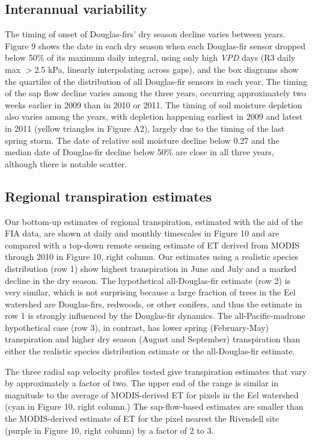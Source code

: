 \subsection{Interannual variability}
The timing of onset of Douglas-firs' dry season decline varies between years.  Figure 9 shows the date in each dry season when each Douglas-fir sensor dropped below 50\% of its maximum daily integral, using only high \textit{VPD} days (R3 daily max $>$2.5 kPa, linearly interpolating across gaps), and the box diagrams show the quartiles of the distribution of all Douglas-fir sensors in each year.  The timing of the sap flow decline varies among the three years, occurring approximately two weeks earlier in 2009 than in 2010 or 2011.  The timing of soil moisture depletion also varies among the years, with depletion happening earliest in 2009 and latest in 2011 (yellow triangles in Figure A2), largely due to the timing of the last spring storm.  The date of relative soil moisture decline below 0.27 and the median date of Douglas-fir decline below 50\% are close in all three years, although there is notable scatter.

\subsection{Regional transpiration estimates}
Our bottom-up estimates of regional transpiration, estimated with the aid of the FIA data, are shown at daily and monthly timescales in Figure 10 and are compared with a top-down remote sensing estimate of ET derived from MODIS through 2010 in Figure 10, right column.  Our estimates using a realistic species distribution (row 1) show highest transpiration in June and July and a marked decline in the dry season.  The hypothetical all-Douglas-fir estimate (row 2) is very similar, which is not surprising because a large fraction of trees in the Eel watershed are Douglas-firs, redwoods, or other conifers, and thus the estimate in row 1 is strongly influenced by the Douglas-fir dynamics.  The all-Pacific-madrone hypothetical case (row 3), in contrast, has lower spring (February-May) transpiration and higher dry season (August and September) transpiration than either the realistic species distribution estimate or the all-Douglas-fir estimate.

The three radial sap velocity profiles tested give transpiration estimates that vary by approximately a factor of two.  The upper end of the range is similar in magnitude to the average of MODIS-derived ET for pixels in the Eel watershed (cyan in Figure 10, right column.)  The sap-flow-based estimates are smaller than the MODIS-derived estimate of ET for the pixel nearest the Rivendell site (purple in Figure 10, right column) by a factor of 2 to 3.

